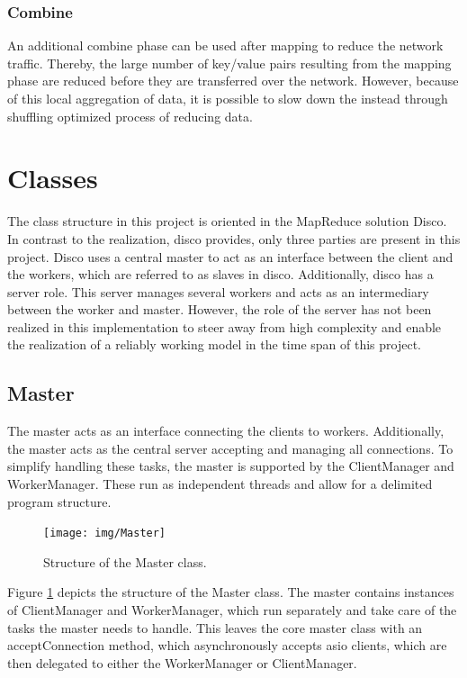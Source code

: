 \documentclass[12pt, letterpaper]{article}
\begin{document}
\subsubsection{Combine}
An additional combine phase can be used after mapping to reduce the network traffic. Thereby, the large number of key/value pairs resulting from the mapping phase are reduced before they are transferred over the network. However, because of this local aggregation of data, it is possible to slow down the instead through shuffling optimized process of reducing data.

\section{Classes}

The class structure in this project is oriented in the MapReduce solution Disco. In contrast to the realization, disco provides, only three parties are present in this project. Disco uses a central master to act as an interface between the client and the workers, which are referred to as slaves in disco. Additionally, disco has a server role. This server manages several workers and acts as an intermediary between the worker and master. However, the role of the server has not been realized in this implementation to steer away from high complexity and enable the realization of a reliably working model in the time span of this project.

\subsection{Master}

The master acts as an interface connecting the clients to workers. Additionally, the master acts as the central server accepting and managing all connections. To simplify handling these tasks, the master is supported by the ClientManager and WorkerManager. These run as independent threads and allow for a delimited program structure.

\begin{figure}[h]
	\centering
	\texttt{[image: img/Master]}
	\caption{Structure of the Master class.}
	\label{fig:classes_Master}
\end{figure}

Figure \ref{fig:classes_Master} depicts the structure of the Master class. The master contains instances of ClientManager and WorkerManager, which run separately and take care of the tasks the master needs to handle. This leaves the core master class with an acceptConnection method, which asynchronously accepts asio clients, which are then delegated to either the WorkerManager or ClientManager.    
\end{document}
